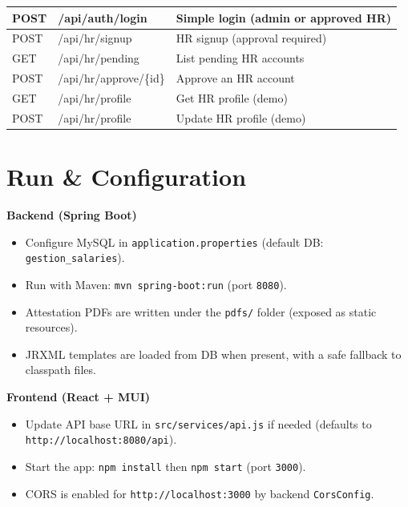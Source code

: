 \documentclass[a4paper,12pt]{report}
\begin{document}
\begin{doublespace}
\begin{center}
\begin{tabular}{|l|l|p{9cm}|}
\hline
POST & /api/auth/login & Simple login (admin or approved HR) \\
\hline
POST & /api/hr/signup & HR signup (approval required) \\
\hline
GET & /api/hr/pending & List pending HR accounts \\
\hline
POST & /api/hr/approve/\{id\} & Approve an HR account \\
\hline
GET & /api/hr/profile & Get HR profile (demo) \\
\hline
POST & /api/hr/profile & Update HR profile (demo) \\
\hline
\end{tabular}
\end{center}
\end{doublespace}

\section{Run \& Configuration}
\begin{doublespace}
\textbf{Backend (Spring Boot)}
\begin{itemize}
  \item Configure MySQL in \texttt{application.properties} (default DB: \texttt{gestion\_salaries}).
  \item Run with Maven: \texttt{mvn spring-boot:run} (port \texttt{8080}).
  \item Attestation PDFs are written under the \texttt{pdfs/} folder (exposed as static resources).
  \item JRXML templates are loaded from DB when present, with a safe fallback to classpath files.
\end{itemize}

\textbf{Frontend (React + MUI)}
\begin{itemize}
  \item Update API base URL in \texttt{src/services/api.js} if needed (defaults to \texttt{http://localhost:8080/api}).
  \item Start the app: \texttt{npm install} then \texttt{npm start} (port \texttt{3000}).
  \item CORS is enabled for \texttt{http://localhost:3000} by backend \texttt{CorsConfig}.
\end{itemize}
\end{doublespace}
\end{document}
